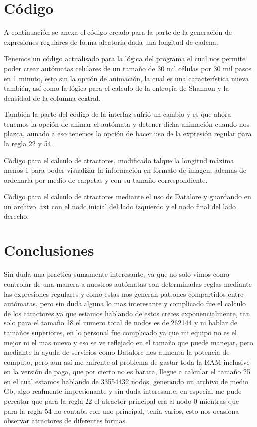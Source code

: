 \documentclass[11pt]{article}
\begin{document}
	\section{Código}	
	A continuación se anexa el código creado para la parte de la generación de expresiones regulares de forma aleatoria dada una longitud de cadena.

\par
	Tenemos un código actualizado para la lógica del programa el cual nos permite poder crear autómatas celulares de un tamaño de 30 mil células por 30 mil pasos en 1 minuto, esto sin la opción de animación, la cual es una característica nueva también, así como la lógica para el calculo de la entropia de Shannon y la densidad de la columna central.

\par
	También la parte del código de la interfaz sufrió un cambio y es que ahora tenemos la opción de animar el autómata y detener dicha animación cuando nos plazca, aunado a eso tenemos la opción de hacer uso de la expresión regular para la regla 22 y 54.

\par
	Código para el calculo de atractores, modificado talque la longitud máxima menos 1 para poder visualizar la información en formato de imagen, ademas de ordenarla por medio de carpetas y con su tamaño correspondiente.

\par
	Código para el calculo de atractores mediante el uso de Datalore y guardando en un archivo .txt con el nodo inicial del lado izquierdo y el nodo final del lado derecho.

\par
	\section{Conclusiones}
	Sin duda una practica sumamente interesante, ya que no solo vimos como controlar de una manera a nuestros autómatas con determinadas reglas mediante las expresiones regulares y como estas nos generan patrones compartidos entre autómatas, pero sin duda alguna lo mas interesante y complicado fue el calculo de los atractores ya que estamos hablando de estos creces exponencialmente, tan solo para el tamaño 18 el numero total de nodos es de 262144 y ni hablar de tamaños superiores, en lo personal fue complicado ya que mi equipo no es el mejor ni el mas nuevo y eso se ve reflejado en el tamaño que puede manejar, pero mediante la ayuda de servicios como Datalore nos aumenta la potencia de computo, pero aun así me enfrente al problema de gastar toda la RAM inclusive en la versión de paga, que por cierto no es barata, llegue a calcular el tamaño 25 en el cual estamos hablando de 33554432 nodos, generando un archivo de medio Gb, algo realmente impresionante y sin duda interesante, en especial me pude percatar que para la regla 22 el atractor principal era el nodo 0 mientras que para la regla 54 no contaba con uno principal, tenia varios, esto nos ocasiona observar atractores de diferentes formas.
	
\end{document}
